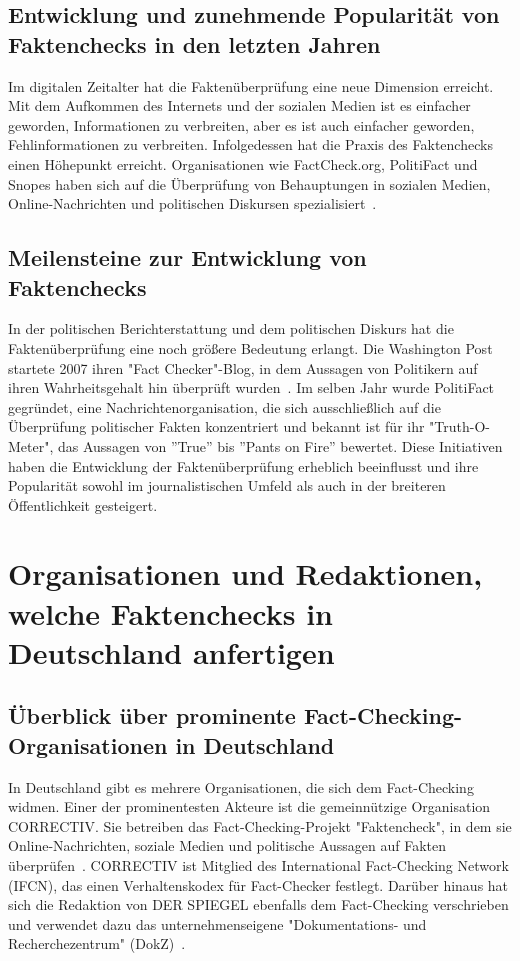 \documentclass[a4paper,listof=totoc,bibliography=totoc]{scrartcl}
\begin{document}
\subsection{Entwicklung und zunehmende Popularität von Faktenchecks in den letzten Jahren}

Im digitalen Zeitalter hat die Faktenüberprüfung eine neue Dimension erreicht. Mit dem Aufkommen 
des Internets und der sozialen Medien ist es einfacher geworden, Informationen zu verbreiten, aber 
es ist auch einfacher geworden, Fehlinformationen zu verbreiten. Infolgedessen hat die Praxis des 
Faktenchecks einen Höhepunkt erreicht. Organisationen wie FactCheck.org, PolitiFact und Snopes haben 
sich auf die Überprüfung von Behauptungen in sozialen Medien, Online-Nachrichten und politischen 
Diskursen spezialisiert~\cite{nyhan2010,funke2019}.

\subsection{Meilensteine zur Entwicklung von Faktenchecks}

In der politischen Berichterstattung und dem politischen Diskurs hat die Faktenüberprüfung eine 
noch größere Bedeutung erlangt. Die Washington Post startete 2007 ihren "Fact Checker"-Blog, in 
dem Aussagen von Politikern auf ihren Wahrheitsgehalt hin überprüft wurden~\cite{dobbs2007}. 
Im selben Jahr wurde PolitiFact gegründet, eine Nachrichtenorganisation, die sich ausschließlich 
auf die Überprüfung politischer Fakten konzentriert und bekannt ist für ihr "Truth-O-Meter", das 
Aussagen von ''True'' bis ''Pants on Fire'' bewertet\cite{aden2019}. 
Diese Initiativen haben die Entwicklung der Faktenüberprüfung erheblich beeinflusst und ihre 
Popularität sowohl im journalistischen Umfeld als auch in der breiteren Öffentlichkeit gesteigert.

\section{Organisationen und Redaktionen, welche Faktenchecks in Deutschland anfertigen}

\subsection{Überblick über prominente Fact-Checking-Organisationen in Deutschland}

In Deutschland gibt es mehrere Organisationen, die sich dem Fact-Checking widmen. Einer der 
prominentesten Akteure ist die gemeinnützige Organisation CORRECTIV. Sie betreiben das 
Fact-Checking-Projekt "Faktencheck", in dem sie Online-Nachrichten, soziale Medien und 
politische Aussagen auf Fakten überprüfen~\cite{humprecht2020}.\newline
CORRECTIV ist Mitglied des International Fact-Checking Network (IFCN), das einen Verhaltenskodex
für Fact-Checker festlegt.
Darüber hinaus hat sich die Redaktion von DER SPIEGEL ebenfalls dem Fact-Checking verschrieben 
und verwendet dazu das unternehmenseigene "Dokumentations- und Recherchezentrum" (DokZ)~\cite{benz2017}. 
\end{document}
